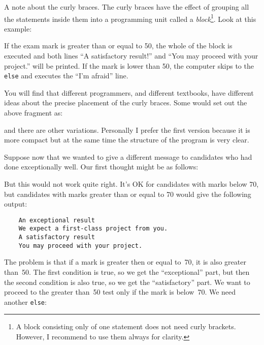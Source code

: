 
A note about the curly braces. The curly braces have the effect of
grouping all the statements inside 
them into a programming unit called a \emph{block}\footnote{A block
  consisting only of one statement does not need curly
  brackets. However, I recommend to use them always for
  clarity.}. Look at this example: 


If the exam mark is greater than or equal to 50, 
the whole of the block is executed and both
lines ``A satisfactory result!'' and ``You may proceed with your
project.'' will be printed.  If the mark is lower than 50, 
the computer skips to
the \verb!else! and executes the ``I'm afraid'' line.

You will find that different programmers, and different textbooks, have
different ideas about the precise placement of the curly braces.  Some would
set out the above fragment as:


and there are other variations. Personally I prefer the first version
because it is more compact but at the same time the structure of the
program is very clear. 

Suppose now that we wanted to give a different message to candidates who
had done exceptionally well. Our first thought might be as follows:


But this would not work quite right.  It's OK for candidates with
marks below 70,
but candidates with marks greater than or equal to 70 
would give the following output:

\begin{Verbatim}
    An exceptional result
    We expect a first-class project from you.
    A satisfactory result
    You may proceed with your project.
\end{Verbatim}

The problem is that if a mark is greater then or equal to~70, it is
also greater than~50.  The first
condition is true, so we get the ``exceptional'' part, but then the second
condition is also true, so we get the ``satisfactory'' part.  We want to
proceed to the greater than~50 test only if the mark is below~70.
We need another \verb!else!:


